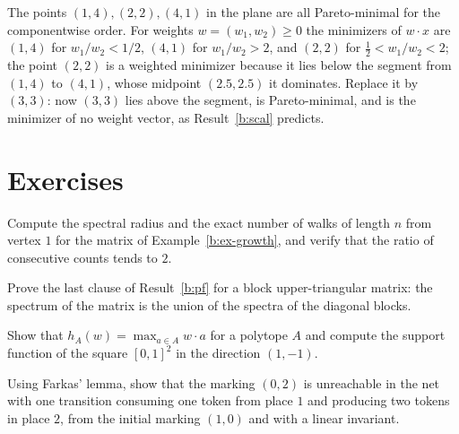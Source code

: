 \begin{example}\label{b:ex-scal}
The points $(1,4),(2,2),(4,1)$ in the plane are all Pareto-minimal for the componentwise order. For weights $w=(w_1,w_2)\ge0$ the minimizers of $w\cdot x$ are $(1,4)$ for $w_1/w_2<1/2$, $(4,1)$ for $w_1/w_2>2$, and $(2,2)$ for $\tfrac12<w_1/w_2<2$; the point $(2,2)$ is a weighted minimizer because it lies below the segment from $(1,4)$ to $(4,1)$, whose midpoint $(2.5,2.5)$ it dominates. Replace it by $(3,3)$: now $(3,3)$ lies above the segment, is Pareto-minimal, and is the minimizer of no weight vector, as Result~\ref{b:scal} predicts.
\end{example}

\section*{Exercises}

\begin{exercise}
Compute the spectral radius and the exact number of walks of length $n$ from vertex $1$ for the matrix of Example~\ref{b:ex-growth}, and verify that the ratio of consecutive counts tends to $2$.
\end{exercise}
\begin{exercise}
Prove the last clause of Result~\ref{b:pf} for a block upper-triangular matrix: the spectrum of the matrix is the union of the spectra of the diagonal blocks.
\end{exercise}
\begin{exercise}
Show that $h_{A}(w)=\max_{a\in A}w\cdot a$ for a polytope $A$ and compute the support function of the square $[0,1]^2$ in the direction $(1,-1)$.
\end{exercise}
\begin{exercise}
Using Farkas' lemma, show that the marking $(0,2)$ is unreachable in the net with one transition consuming one token from place $1$ and producing two tokens in place $2$, from the initial marking $(1,0)$ and with a linear invariant.
\end{exercise}
